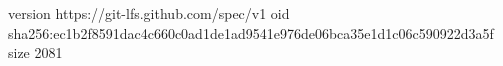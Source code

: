 version https://git-lfs.github.com/spec/v1
oid sha256:ec1b2f8591dac4c660c0ad1de1ad9541e976de06bca35e1d1c06c590922d3a5f
size 2081
